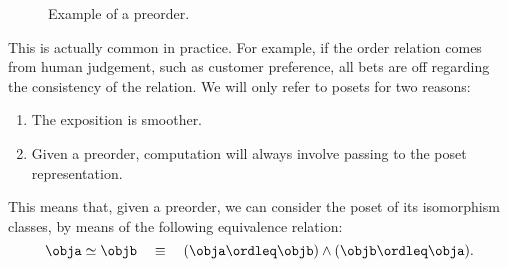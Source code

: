 \begin{figure}[tbh]
    \begin{center}
    \end{center}
    \caption{Example of a preorder. }
    \label{fig:preorder}
\end{figure}

This is actually common in practice. For example, if the order relation comes from human judgement, such as customer preference, all bets are off regarding the consistency of the relation. We will only refer to posets for two reasons:
\begin{enumerate}
    \item The exposition is smoother.
    \item Given a preorder, computation will always involve passing to the poset representation.
\end{enumerate}
This means that, given a preorder, we can consider the poset of its isomorphism classes, by means of the following equivalence relation:
\begin{equation}
    \obja \simeq \objb \quad \equiv \quad (\obja \ordleq \objb) \wedge (\objb \ordleq \obja).
\end{equation}


